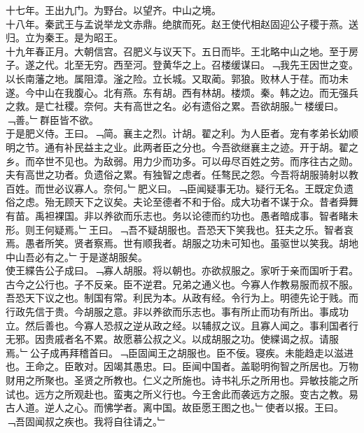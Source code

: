 \documentclass{zhvt-classic}
\begin{document}
\hspace*{2em}十七年。王出九门。为野台。以望齐。中山之境。\\
\hspace*{2em}十八年。秦武王与孟说举龙文赤鼎。绝膑而死。赵王使代相赵固迎公子稷于燕。送归。立为秦王。是为昭王。\\
\hspace*{2em}十九年春正月。大朝信宫。召肥义与议天下。五日而毕。王北略中山之地。至于房子。遂之代。北至无穷。西至河。登黄华之上。召楼缓谋曰。﹁我先王因世之变。以长南藩之地。属阻漳。滏之险。立长城。又取蔺。郭狼。败林人于荏。而功未遂。今中山在我腹心。北有燕。东有胡。西有林胡。楼烦。秦。韩之边。而无强兵之救。是亡社稷。奈何。夫有高世之名。必有遗俗之累。吾欲胡服。﹂楼缓曰。﹁善。﹂群臣皆不欲。\\
\hspace*{2em}于是肥义侍。王曰。﹁简。襄主之烈。计胡。翟之利。为人臣者。宠有孝弟长幼顺明之节。通有补民益主之业。此两者臣之分也。今吾欲继襄主之迹。开于胡。翟之乡。而卒世不见也。为敌弱。用力少而功多。可以毋尽百姓之劳。而序往古之勋。夫有高世之功者。负遗俗之累。有独智之虑者。任骜民之怨。今吾将胡服骑射以教百姓。而世必议寡人。奈何。﹂肥义曰。﹁臣闻疑事无功。疑行无名。王既定负遗俗之虑。殆无顾天下之议矣。夫论至德者不和于俗。成大功者不谋于众。昔者舜舞有苗。禹袒裸国。非以养欲而乐志也。务以论德而约功也。愚者暗成事。智者睹未形。则王何疑焉。﹂王曰。﹁吾不疑胡服也。吾恐天下笑我也。狂夫之乐。智者哀焉。愚者所笑。贤者察焉。世有顺我者。胡服之功未可知也。虽驱世以笑我。胡地中山吾必有之。﹂于是遂胡服矣。\\
\hspace*{2em}使王緤告公子成曰。﹁寡人胡服。将以朝也。亦欲叔服之。家听于亲而国听于君。古今之公行也。子不反亲。臣不逆君。兄弟之通义也。今寡人作教易服而叔不服。吾恐天下议之也。制国有常。利民为本。从政有经。令行为上。明德先论于贱。而行政先信于贵。今胡服之意。非以养欲而乐志也。事有所止而功有所出。事成功立。然后善也。今寡人恐叔之逆从政之经。以辅叔之议。且寡人闻之。事利国者行无邪。因贵戚者名不累。故愿慕公叔之义。以成胡服之功。使緤谒之叔。请服焉。﹂公子成再拜稽首曰。﹁臣固闻王之胡服也。臣不佞。寝疾。未能趋走以滋进也。王命之。臣敢对。因竭其愚忠。曰。臣闻中国者。盖聪明徇智之所居也。万物财用之所聚也。圣贤之所教也。仁义之所施也。诗书礼乐之所用也。异敏技能之所试也。远方之所观赴也。蛮夷之所义行也。今王舍此而袭远方之服。变古之教。易古人道。逆人之心。而怫学者。离中国。故臣愿王图之也。﹂使者以报。王曰。﹁吾固闻叔之疾也。我将自往请之。﹂\\
\end{document}
